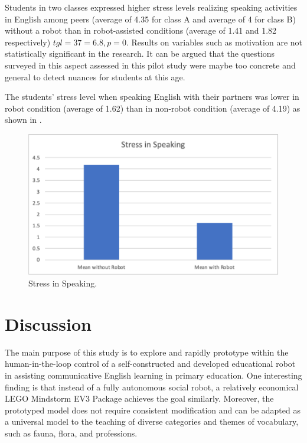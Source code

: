 \documentclass[english]{textolivre}
\begin{document}
Students in two classes expressed higher stress levels realizing speaking activities in English among peers (average of 4.35 for class A and average of 4 for class B) without a robot than in robot-assisted conditions (average of 1.41 and 1.82 respectively) $tgl=37=6.8, p=0$. Results on variables such as motivation are not statistically significant in the research. It can be argued that the questions surveyed in this aspect assessed in this pilot study were maybe too concrete and general to detect nuances for students at this age.

The students’ stress level when speaking English with their partners was lower in robot condition (average of 1.62) than in non-robot condition (average of 4.19) as shown in .

\begin{figure}[h!]
\centering
\begin{minipage}{.85\textwidth}
 \includegraphics[width=\textwidth]{Fig9.pdf}
 \caption{Stress in Speaking.}
 \label{fig09}
\end{minipage}
\end{figure}

\section{Discussion}\label{sec-outras-estr}
The main purpose of this study is to explore and rapidly prototype within the human-in-the-loop control of a self-constructed and developed educational robot in assisting communicative English learning in primary education. One interesting finding is that instead of a fully autonomous social robot, a relatively economical LEGO Mindstorm EV3 Package achieves the goal similarly. Moreover, the prototyped model does not require consistent modification and can be adapted as a universal model to the teaching of diverse categories and themes of vocabulary, such as fauna, flora, and professions.
\end{document}
